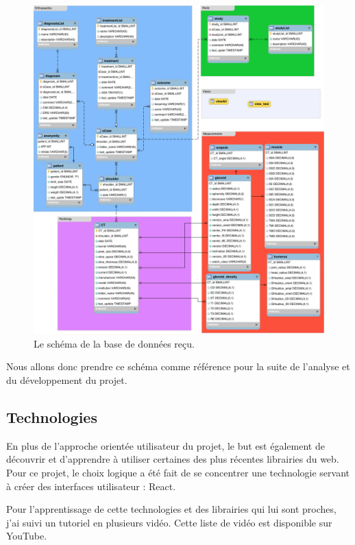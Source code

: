 		\begin{figure}[!h]
			\centering
			\includegraphics[width=1\textwidth]{images/analyse/SQLshoulderDatabase_reduced}
			\caption{Le schéma de la base de données reçu.}
			\label{schema_db}
		\end{figure}

		Nous allons donc prendre ce schéma comme référence pour la suite de l'analyse et du développement du projet.

	\subsection{Technologies}

		En plus de l'approche orientée utilisateur du projet, le but est également de découvrir et d'apprendre à utiliser certaines des plus récentes librairies du web. Pour ce projet, le choix logique a été fait de se concentrer une technologie servant à créer des interfaces utilisateur : React.

		Pour l'apprentissage de cette technologies et des librairies qui lui sont proches, j'ai suivi un tutoriel en plusieurs vidéo. Cette liste de vidéo est disponible sur YouTube\cite{learncode-academy}. 

